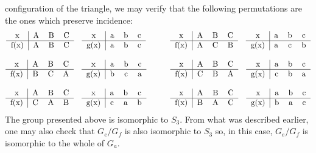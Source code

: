 \documentclass[12pt]{article}
\begin{document}
configuration of the triangle, we may verify that the following
permutations are the ones which preserve incidence:
\[ \begin{matrix} 
 \begin{tabular}{c|ccc}
  x    & A & B & C \\
  \hline
  f(x) & A & B & C
 \end{tabular} \quad
 \begin{tabular}{c|ccc}
  x    & a & b & c \\
  \hline
  g(x) & a & b & c
 \end{tabular} \qquad &
 \begin{tabular}{c|ccc}
  x    & A & B & C \\
  \hline
  f(x) & A & C & B
 \end{tabular} \quad
 \begin{tabular}{c|ccc}
  x    & a & b & c \\
  \hline
  g(x) & a & c & b
 \end{tabular} \\ \\
 \begin{tabular}{c|ccc}
  x    & A & B & C \\
  \hline
  f(x) & B & C & A
 \end{tabular} \quad 
 \begin{tabular}{c|ccc}
  x    & a & b & c \\
  \hline
  g(x) & b & c & a
 \end{tabular} \qquad &
 \begin{tabular}{c|ccc}
  x    & A & B & C \\
  \hline
  f(x) & C & B & A
 \end{tabular} \quad
 \begin{tabular}{c|ccc}
  x    & a & b & c \\
  \hline
  g(x) & c & b & a
 \end{tabular} \\ \\
 \begin{tabular}{c|ccc}
  x    & A & B & C \\
  \hline
  f(x) & C & A & B
 \end{tabular} \quad
 \begin{tabular}{c|ccc}
  x    & a & b & c \\
  \hline
  g(x) & c & a & b
 \end{tabular} \qquad &
 \begin{tabular}{c|ccc}
  x    & A & B & C \\
  \hline
  f(x) & B & A & C
 \end{tabular} \quad
 \begin{tabular}{c|ccc}
  x    & a & b & c \\
  \hline
  g(x) & b & a & c
 \end{tabular} 
\end{matrix} \]
The group presented above is isomorphic to $S_3$.  From what was described
earlier, one may also check that $G_e / G_f$ is also isomorphic to $S_3$ so,
in this case, $G_e / G_f$ is isomorphic to the whole of $G_a$.
\end{document}
